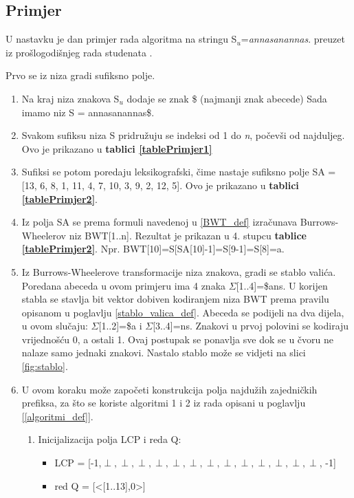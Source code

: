 \documentclass[times, utf8, seminar]{fer}
\begin{document}
\subsection{Primjer}
\label{chptr_primjer}
U nastavku je dan primjer rada algoritma na stringu S$_u$=\textit{annasanannas}. preuzet iz prošlogodišnjeg rada studenata \cite{studenti2016}.

Prvo se iz niza gradi sufiksno polje. 


\begin{enumerate}
  \item Na kraj niza znakova S$_u$ dodaje se znak \$ (najmanji znak abecede) Sada imamo niz S = annasanannas\$.
  \item Svakom sufiksu niza S pridružuju se indeksi od 1 do \textit{n}, počevši od najduljeg. Ovo je prikazano u \textbf{tablici \ref{tablePrimjer1}}
  \item Sufiksi se potom poredaju leksikografski, čime nastaje sufiksno polje SA = [13, 6, 8, 1, 11, 4, 7, 10, 3, 9, 2, 12, 5]. Ovo je prikazano u \textbf{tablici \ref{tablePrimjer2}}.
  \item Iz polja SA se prema formuli navedenoj u \ref{BWT_def} izračunava Burrows-Wheelerov niz BWT[1..n]. 
  Rezultat je prikazan u 4. stupcu \textbf{tablice \ref{tablePrimjer2}}. 
  \newline Npr. BWT[10]=S[SA[10]-1]=S[9-1]=S[8]=a.
  \item Iz Burrows-Wheelerove transformacije niza znakova, gradi se stablo valića. Poredana abeceda u ovom primjeru ima 4 znaka $\Sigma$[1..4]=\$ans. U korijen stabla se stavlja bit vektor dobiven kodiranjem niza BWT prema pravilu opisanom u poglavlju \ref{stablo_valica_def}. Abeceda se podijeli na dva dijela, u ovom slučaju: $\Sigma$[1..2]=\$a i $\Sigma$[3..4]=ns. Znakovi u prvoj polovini se kodiraju vrijednošću 0, a ostali 1. Ovaj postupak se ponavlja sve dok se u čvoru ne nalaze samo jednaki znakovi. Nastalo stablo može se vidjeti na slici \ref{fig:stablo}.
  \item U ovom koraku može započeti konstrukcija polja najdužih zajedničkih prefiksa, za što se koriste algoritmi 1 i 2 iz rada \cite{beller2013} opisani u poglavlju \ref{[algoritmi_def]}.
  \begin{enumerate}
  \item Inicijalizacija polja LCP i reda Q:
  \begin{itemize}
  \item LCP = [-1,$\perp,\perp,\perp,\perp,\perp,\perp,\perp,\perp,\perp,\perp,\perp,\perp, \perp$, -1]
  \item red Q = [<[1..13],0>]

\end{itemize}
\end{enumerate}
\end{enumerate}
\end{document}
